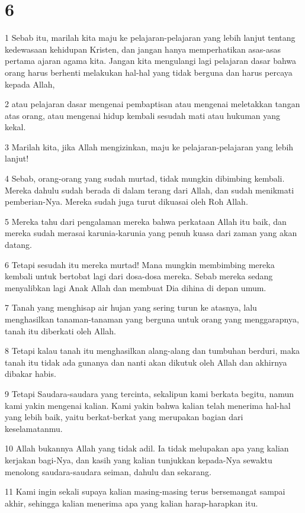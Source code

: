 \chapter{6}

\par 1 Sebab itu, marilah kita maju ke pelajaran-pelajaran yang lebih lanjut tentang kedewasaan kehidupan Kristen, dan jangan hanya memperhatikan asas-asas pertama ajaran agama kita. Jangan kita mengulangi lagi pelajaran dasar bahwa orang harus berhenti melakukan hal-hal yang tidak berguna dan harus percaya kepada Allah,
\par 2 atau pelajaran dasar mengenai pembaptisan atau mengenai meletakkan tangan atas orang, atau mengenai hidup kembali sesudah mati atau hukuman yang kekal.
\par 3 Marilah kita, jika Allah mengizinkan, maju ke pelajaran-pelajaran yang lebih lanjut!
\par 4 Sebab, orang-orang yang sudah murtad, tidak mungkin dibimbing kembali. Mereka dahulu sudah berada di dalam terang dari Allah, dan sudah menikmati pemberian-Nya. Mereka sudah juga turut dikuasai oleh Roh Allah.
\par 5 Mereka tahu dari pengalaman mereka bahwa perkataan Allah itu baik, dan mereka sudah merasai karunia-karunia yang penuh kuasa dari zaman yang akan datang.
\par 6 Tetapi sesudah itu mereka murtad! Mana mungkin membimbing mereka kembali untuk bertobat lagi dari dosa-dosa mereka. Sebab mereka sedang menyalibkan lagi Anak Allah dan membuat Dia dihina di depan umum.
\par 7 Tanah yang menghisap air hujan yang sering turun ke atasnya, lalu menghasilkan tanaman-tanaman yang berguna untuk orang yang menggarapnya, tanah itu diberkati oleh Allah.
\par 8 Tetapi kalau tanah itu menghasilkan alang-alang dan tumbuhan berduri, maka tanah itu tidak ada gunanya dan nanti akan dikutuk oleh Allah dan akhirnya dibakar habis.
\par 9 Tetapi Saudara-saudara yang tercinta, sekalipun kami berkata begitu, namun kami yakin mengenai kalian. Kami yakin bahwa kalian telah menerima hal-hal yang lebih baik, yaitu berkat-berkat yang merupakan bagian dari keselamatanmu.
\par 10 Allah bukannya Allah yang tidak adil. Ia tidak melupakan apa yang kalian kerjakan bagi-Nya, dan kasih yang kalian tunjukkan kepada-Nya sewaktu menolong saudara-saudara seiman, dahulu dan sekarang.
\par 11 Kami ingin sekali supaya kalian masing-masing terus bersemangat sampai akhir, sehingga kalian menerima apa yang kalian harap-harapkan itu.

